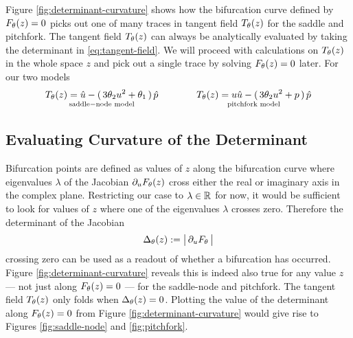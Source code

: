 Figure \ref{fig:determinant-curvature} shows how the bifurcation curve defined by $F_{\theta}(z)=0$ picks out one of many traces in tangent field $T_{\theta}(z)$ for the saddle and pitchfork. The tangent field $T_{\theta}(z)$ can always be analytically evaluated by taking the determinant in \eqref{eq:tangent-field}. We will proceed with calculations on $T_{\theta}(z)$ in the whole space $z$ and pick out a single trace by solving $F_{\theta}(z)=0$ later. For our two models
\begin{align}
    \underset{\mathrm{saddle-node\,\,model}}{
    T_{\theta}(z)=\hat{u}-(\,3\theta_2 u^2+\theta_1\,)\,\hat{p}}
    \qquad\qquad
    \underset{\mathrm{pitchfork\,\,model}}{
    T_{\theta}(z)=u\hat{u}-(\,3\theta_2 u^2+p\,)\,\hat{p}}
    \label{eq:tangent-field-examples}
\end{align}

\subsection{Evaluating Curvature of the Determinant}
Bifurcation points are defined as values of $z$ along the bifurcation curve where eigenvalues $\lambda$ of the Jacobian $\partial_u F_{\theta}(z)$ cross either the real or imaginary axis in the complex plane. Restricting our case to $\lambda\in\mathbb{R}$ for now, it would be sufficient to look for values of $z$ where one of the eigenvalues $\lambda$ crosses zero. Therefore the determinant of the Jacobian
\begin{align}
    \Delta_{\theta}(z) := \big|\,\partial_u F_{\theta}\,\big|
\end{align}
crossing zero can be used as a readout of whether a bifurcation has occurred. Figure \ref{fig:determinant-curvature} reveals this is indeed also true for any value $z$ --- not just along $F_{\theta}(z)=0$ --- for the saddle-node and pitchfork. The tangent field $T_{\theta}(z)$ only folds when $\Delta_{\theta}(z)=0$. Plotting the value of the determinant along $F_{\theta}(z)=0$ from Figure \ref{fig:determinant-curvature} would give rise to Figures \ref{fig:saddle-node} and \ref{fig:pitchfork}.

